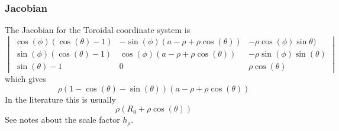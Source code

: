\documentclass[a4paper,10pt]{article}
\numberwithin{equation}{section}
\begin{document}
\subsubsection{Jacobian}
The Jacobian for the Toroidal coordinate system is
\begin{equation}
\begin{vmatrix}
\cos(\phi)(\cos(\theta) - 1) & -\sin(\phi)(a - \rho + \rho\cos(\theta)) & -\rho\cos(\phi)\sin\theta)\\
\sin(\phi)(\cos(\theta) - 1) & \cos(\phi)(a - \rho + \rho\cos(\theta))   & -\rho\sin(\phi)\sin(\theta)\\
\sin(\theta) - 1             & 0                                         & \rho\cos(\theta)
\end{vmatrix}
\end{equation}
which gives
\begin{equation}
  \rho(1- \cos(\theta) - \sin(\theta))(a - \rho + \rho\cos(\theta))
\end{equation}
In the literature this is usually
\begin{equation}
  \rho(R_0 + \rho\cos(\theta))
\end{equation}
See notes about the scale factor \(h_\rho\).
%
\end{document}
